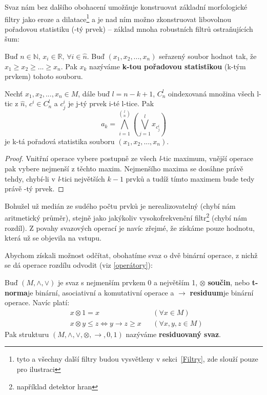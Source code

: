     Svaz nám bez dalšího obohacení umožňuje konstruovat základní morfologické filtry jako eroze a dilatace\footnote{tyto a všechny další filtry budou vysvětleny v sekci~\ref{Filtry}, zde slouží pouze pro ilustraci} a je nad ním možno zkonstruovat libovolnou pořadovou statistiku (\kk-tý prvek) -- základ mnoha robustních filtrů ostraňujících šum:

    \begin{define}\label{def k-prvek}
      Buď $n \in \mathbb{N}$, $x_i \in \mathbb{R}, \,\forall i \in \widehat n$. Buď $(x_1,x_2,...,x_n)$ seřazený soubor hodnot tak, že $x_1 \geq x_2 \geq ... \geq x_n$. Pak $x_k$ nazýváme \textbf{k-tou pořadovou statistikou} (k-tým prvkem) tohoto souboru.
    \end{define}

    \begin{theo}\label{theo k-tý prvek}
      Nechť $x_1,x_2,...,x_n \in M$, dále buď $l = n-k+1$, $C^{l}_n$ oindexovaná množina všech l-tic z $\widehat n$, $c^i \in C^{l}_n$ a $c^i_j$ je j-tý prvek i-té l-tice. Pak
      \[
        a_k = \bigwedge_{i = 1}^{{l}\choose{n}}\left( \bigvee_{j = 1}^{l} x_{c_{j}^i} \right)
      \]
      je k-tá pořadová statistika souboru $(x_1,x_2,...,x_n)$.
    \end{theo}
    \begin{proof}
      Vnitřní operace vybere postupně ze všech \textit{l}-tic maximum, vnější operace pak vybere nejmenší z těchto maxim. Nejmenšího maxima se dosáhne právě tehdy, chybí-li v \textit{l}-tici největších $k-1$ prvků a tudíž tímto maximem bude tedy právě \kk-tý prvek.
    \end{proof}

    Bohužel už medián ze sudého počtu prvků je nerealizovatelný (chybí nám aritmetický průměr), stejně jako jakýkoliv vysokofrekvenční filtr\footnote{například detektor hran} (chybí nám rozdíl). Z povahy svazových operací je navíc zřejmé, že získáme pouze hodnotu, která už se objevila na vstupu.

    Abychom získali možnost odčítat, obohatíme svaz o dvě binární operace, z nichž se dá operace rozdílu odvodit (viz \ref{operátory}):

    \begin{define}\label{def residuovaný svaz}
    Buď $(M,\wedge,\vee)$ je svaz s nejmenším prvkem 0 a největším 1, $\otimes$ \rl \textbf{součin}, nebo \textbf{t-norma}\rr je binární, asociativní a komutativní operace a $\rightarrow$ \rl \textbf{residuum}\rr je binární operace. Navíc platí:
    \begin{align}
    &x \otimes 1 = x  &&(\forall x \in M)\\
    &x \otimes y \leq z \Leftrightarrow y \rightarrow z \geq x &&(\forall x,y,z \in M)\label{Galoisova koresp}
    \end{align}
    Pak strukturu $(M,\wedge,\vee,\otimes,\rightarrow,0,1)$ nazýváme \textbf{residuovaný svaz}.
    \end{define}

